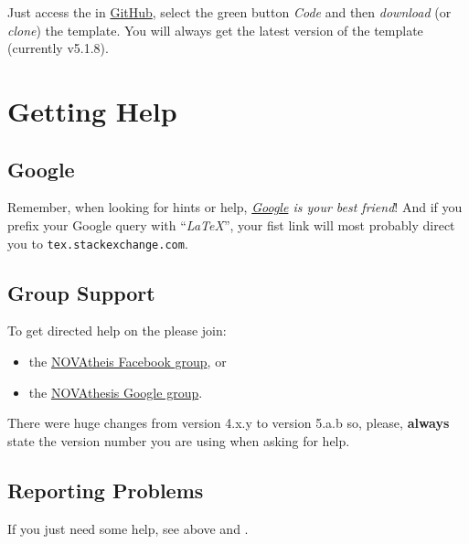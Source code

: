 Just access the  in \href{https://github.com/joaomlourenco/novathesis}{GitHub}, select the green button \emph{Code} and then \emph{download} (or \emph{clone}) the template.  You will always get the latest version of the template (currently v5.1.8).


\section{Getting Help}
\label{sec:getting_help}

\begin{center}  
\end{center}
 
\subsection{Google}
\label{sub:group_google}

Remember, when looking for hints or help, \emph{\href{google.com}{Google} is your best friend}!   And if you prefix your Google query with “\emph{LaTeX}”, your fist link will most probably direct you to \texttt{tex.stackexchange.com}.

\subsection{Group Support}
\label{sub:group_support}

To get directed help on the  please join:
\begin{itemize}
  \item the \href{https://www.facebook.com/groups/novathesis}{NOVAtheis Facebook group}, or
  \item the \href{https://groups.google.com/forum/#!forum/novathesis}{NOVAthesis Google group}.
\end{itemize}

There were huge changes from version 4.x.y to version 5.a.b so, please, \textbf{always} state the version number you are using when asking for help.

\subsection{Reporting Problems}
\label{sub:reporting_problems}

If you just need some help, see above  and .

